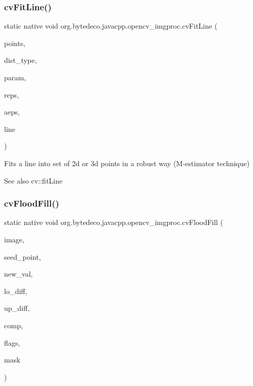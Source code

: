 \subsubsection{\texorpdfstring{cv\+Fit\+Line()}{cvFitLine()}}
{\footnotesize\ttfamily static native void org.\+bytedeco.\+javacpp.\+opencv\+\_\+imgproc.\+cv\+Fit\+Line (\begin{DoxyParamCaption}\item[{@Const Cv\+Arr}]{points,  }\item[{int}]{dist\+\_\+type,  }\item[{double}]{param,  }\item[{double}]{reps,  }\item[{double}]{aeps,  }\item[{Float\+Pointer}]{line }\end{DoxyParamCaption})\hspace{0.3cm}{\ttfamily [static]}}



Fits a line into set of 2d or 3d points in a robust way (M-\/estimator technique) 

\begin{DoxySeeAlso}{See also}
cv\+::fit\+Line 
\end{DoxySeeAlso}
\mbox{\label{group__imgproc__c_ga1e1597636792c696519945f9a56a0768}} 
\subsubsection{\texorpdfstring{cv\+Flood\+Fill()}{cvFloodFill()}}
{\footnotesize\ttfamily static native void org.\+bytedeco.\+javacpp.\+opencv\+\_\+imgproc.\+cv\+Flood\+Fill (\begin{DoxyParamCaption}\item[{Cv\+Arr}]{image,  }\item[{@By\+Val Cv\+Point}]{seed\+\_\+point,  }\item[{@By\+Val Cv\+Scalar}]{new\+\_\+val,  }\item[{@By\+Val(null\+Value=\char`\"{}Cv\+Scalar(cv\+Scalar\+All(0))\char`\"{}) Cv\+Scalar}]{lo\+\_\+diff,  }\item[{@By\+Val(null\+Value=\char`\"{}Cv\+Scalar(cv\+Scalar\+All(0))\char`\"{}) Cv\+Scalar}]{up\+\_\+diff,  }\item[{Cv\+Connected\+Comp}]{comp,  }\item[{int}]{flags,  }\item[{Cv\+Arr}]{mask }\end{DoxyParamCaption})\hspace{0.3cm}{\ttfamily [static]}}



